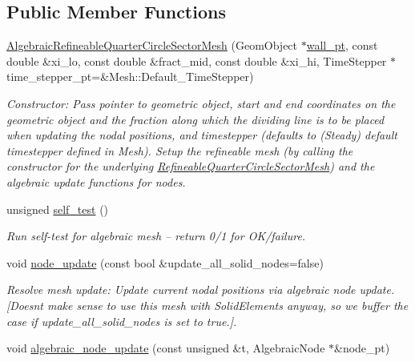\subsection*{Public Member Functions}
\begin{DoxyCompactItemize}
\item 
\hyperlink{classoomph_1_1AlgebraicRefineableQuarterCircleSectorMesh_a4245d6f0499af21053a0381bc69de271}{Algebraic\+Refineable\+Quarter\+Circle\+Sector\+Mesh} (Geom\+Object $\ast$\hyperlink{classoomph_1_1QuarterCircleSectorMesh_a0b03071bbe7e95cc6723c221ddc0998a}{wall\+\_\+pt}, const double \&xi\+\_\+lo, const double \&fract\+\_\+mid, const double \&xi\+\_\+hi, Time\+Stepper $\ast$time\+\_\+stepper\+\_\+pt=\&Mesh\+::\+Default\+\_\+\+Time\+Stepper)
\begin{DoxyCompactList}\small\item\em Constructor\+: Pass pointer to geometric object, start and end coordinates on the geometric object and the fraction along which the dividing line is to be placed when updating the nodal positions, and timestepper (defaults to (Steady) default timestepper defined in Mesh). Setup the refineable mesh (by calling the constructor for the underlying \hyperlink{classoomph_1_1RefineableQuarterCircleSectorMesh}{Refineable\+Quarter\+Circle\+Sector\+Mesh}) and the algebraic update functions for nodes. \end{DoxyCompactList}\item 
unsigned \hyperlink{classoomph_1_1AlgebraicRefineableQuarterCircleSectorMesh_a68d9738e3d3eedc4d2dd8e1b7fb09d8c}{self\+\_\+test} ()
\begin{DoxyCompactList}\small\item\em Run self-\/test for algebraic mesh -- return 0/1 for O\+K/failure. \end{DoxyCompactList}\item 
void \hyperlink{classoomph_1_1AlgebraicRefineableQuarterCircleSectorMesh_a32a096b894031167a90bafdab167ffc7}{node\+\_\+update} (const bool \&update\+\_\+all\+\_\+solid\+\_\+nodes=false)
\begin{DoxyCompactList}\small\item\em Resolve mesh update\+: Update current nodal positions via algebraic node update. \mbox{[}Doesn\textquotesingle{}t make sense to use this mesh with Solid\+Elements anyway, so we buffer the case if update\+\_\+all\+\_\+solid\+\_\+nodes is set to true.\mbox{]}. \end{DoxyCompactList}\item 
void \hyperlink{classoomph_1_1AlgebraicRefineableQuarterCircleSectorMesh_ac591df8f18ad687e1dc9b70b731c2de1}{algebraic\+\_\+node\+\_\+update} (const unsigned \&t, Algebraic\+Node $\ast$\&node\+\_\+pt)

\end{DoxyCompactItemize}
